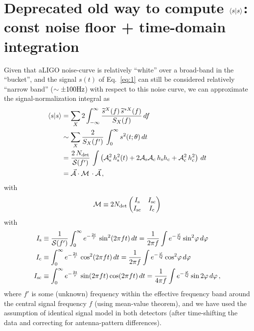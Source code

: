 \documentclass[aps,prd,onecolumn,notitlepage,nofootinbib,superscriptaddress,altaffilletter,floatfix]{revtex4-1}
\begin{document}
\newpage
\appendix

\section{Deprecated old way to compute $\langle s|s\rangle$: const noise floor + time-domain integration}
\label{sec:depr-first-way}

Given that aLIGO noise-curve is relatively ``white'' over a broad-band in the ``bucket'', and the signal $s(t)$ of Eq.~\eqref{eq:1} can still be
considered relatively ``narrow band'' ($\sim \pm 100\mathrm{Hz}$) with respect to this noise curve, we can approximate the signal-normalization integral as
\begin{align}
  \label{eq:17}
  \langle s|s\rangle &= \sum_X 2 \int_{-\infty}^{\infty} \frac{\widetilde{s}^X(f)\,\widetilde{s}^{*X}(f)}{S_X(f)}\,d f\\
  &\sim \sum_X \frac{2}{S_X(f')} \, \int_{0}^{\infty} s^2(t;\theta)\,dt\\
  & = \frac{2\,N_{\mathrm{det}}}{\mathcal{S}(f')} \,\int \left( \mathcal{A}_{\mathrm{s}}^2\,h_\mathrm{s}^2(t) + 2\mathcal{A}_{\mathrm{s}}\mathcal{A}_{\mathrm{c}}\,h_\mathrm{s}h_\mathrm{c} + \mathcal{A}_{\mathrm{c}}^2\,h_\mathrm{c}^2\right)\,d t\\
  & = \vec{\mathcal{A}} \cdot \mathcal{M} \,\cdot\vec{\mathcal{A}}\,,
\end{align}
with
\begin{equation}
  \label{eq:23}
  \mathcal{M} \equiv
  2N_{\mathrm{det}} \begin{pmatrix}
    I_{\mathrm{s}}  & I_{\mathrm{sc}} \\
    I_{\mathrm{sc}}  & I_{\mathrm{c}}\\
  \end{pmatrix}
\end{equation}
with
\begin{align}
  \label{eq:43}
  I_{\mathrm{s}}  &\equiv \frac{1}{\mathcal{S}(f')}\int_0^\infty e^{-\frac{2t}{\tau}}\,\sin^2(2\pi f t)\,dt = \frac{1}{2\pi f}\int e^{-\frac{\varphi}{Q}} \sin^2\!\varphi\,d\varphi\\
  I_{\mathrm{c}}  &\equiv \int_0^\infty e^{-\frac{2t}{\tau}}\,\cos^2(2\pi f t)\,dt = \frac{1}{2\pi f}\int e^{-\frac{\varphi}{Q}} \cos^2\!\varphi\,d\varphi\\
  I_{\mathrm{sc}} &\equiv \int_0^\infty e^{-\frac{2t}{\tau}}\,\sin(2\pi f t)\cos(2\pi f t)\,dt = \frac{1}{4\pi f}\int e^{-\frac{\varphi}{Q}} \sin2\varphi\,d\varphi\,,
\end{align}
where $f'$ is some (unknown) frequency within the effective frequency band around the central signal frequency $f$ (using mean-value theorem), and we
have used the assumption of identical signal model in both detectors (after time-shifting the data and correcting for antenna-pattern differences).
\end{document}
